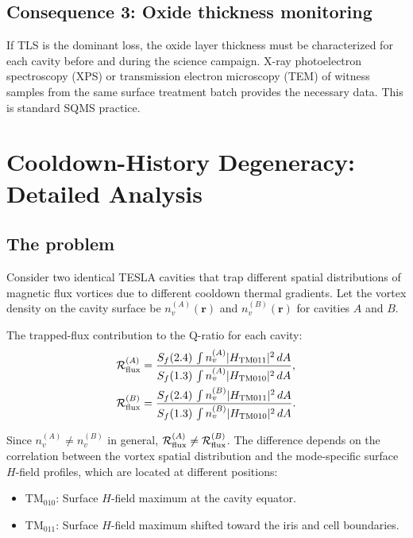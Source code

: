 \documentclass[11pt]{article}
\theoremstyle{definition}
\theoremstyle{remark}
\begin{document}
\subsection{Consequence 3: Oxide thickness monitoring}

If TLS is the dominant loss, the oxide layer thickness must be
characterized for each cavity before and during the science campaign.
X-ray photoelectron spectroscopy (XPS) or transmission electron
microscopy (TEM) of witness samples from the same surface treatment
batch provides the necessary data. This is standard SQMS practice.


\section{Cooldown-History Degeneracy: Detailed Analysis}
\label{sec:cooldown}

\subsection{The problem}

Consider two identical TESLA cavities that trap different spatial
distributions of magnetic flux vortices due to different cooldown
thermal gradients. Let the vortex density on the cavity surface be
$n_v^{(A)}(\mathbf{r})$ and $n_v^{(B)}(\mathbf{r})$ for cavities
$A$ and $B$.

The trapped-flux contribution to the Q-ratio for each cavity:
\begin{align}
\mathcal{R}_{\rm flux}^{(A)} &= \frac{S_f(2.4)\,\int n_v^{(A)}
  |H_{\rm TM011}|^2\,dA}{S_f(1.3)\,\int n_v^{(A)}
  |H_{\rm TM010}|^2\,dA}, \\
\mathcal{R}_{\rm flux}^{(B)} &= \frac{S_f(2.4)\,\int n_v^{(B)}
  |H_{\rm TM011}|^2\,dA}{S_f(1.3)\,\int n_v^{(B)}
  |H_{\rm TM010}|^2\,dA}.
\end{align}

Since $n_v^{(A)} \neq n_v^{(B)}$ in general, $\mathcal{R}_{\rm flux}^{(A)}
\neq \mathcal{R}_{\rm flux}^{(B)}$. The difference depends on the
correlation between the vortex spatial distribution and the mode-specific
surface $H$-field profiles, which are located at different positions:
\begin{itemize}[nosep]
\item TM$_{010}$: Surface $H$-field maximum at the cavity equator.
\item TM$_{011}$: Surface $H$-field maximum shifted toward the iris
  and cell boundaries.
\end{itemize}
\end{document}
